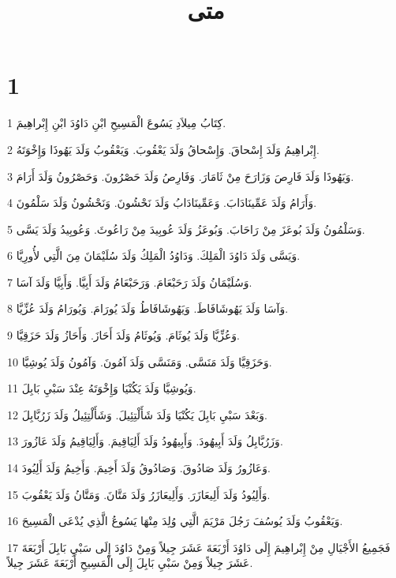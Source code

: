 

\title{متى}


\chapter{1}

\par 1 كِتَابُ مِيلاَدِ يَسُوعَ الْمَسِيحِ ابْنِ دَاوُدَ ابْنِ إِبْراهِيمَ.
\par 2 إِبْراهِيمُ وَلَدَ إِسْحاقَ. وَإِسْحاقُ وَلَدَ يَعْقُوبَ. وَيَعْقُوبُ وَلَدَ يَهُوذَا وَإِخْوَتَهُ.
\par 3 وَيَهُوذَا وَلَدَ فَارِصَ وَزَارَحَ مِنْ ثَامَارَ. وَفَارِصُ وَلَدَ حَصْرُونَ. وَحَصْرُونُ وَلَدَ أَرَامَ.
\par 4 وَأَرَامُ وَلَدَ عَمِّينَادَابَ. وَعَمِّينَادَابُ وَلَدَ نَحْشُونَ. وَنَحْشُونُ وَلَدَ سَلْمُونَ.
\par 5 وَسَلْمُونُ وَلَدَ بُوعَزَ مِنْ رَاحَابَ. وَبُوعَزُ وَلَدَ عُوبِيدَ مِنْ رَاعُوثَ. وَعُوبِيدُ وَلَدَ يَسَّى.
\par 6 وَيَسَّى وَلَدَ دَاوُدَ الْمَلِكَ. وَدَاوُدُ الْمَلِكُ وَلَدَ سُلَيْمَانَ مِنَ الَّتِي لأُورِيَّا.
\par 7 وَسُلَيْمَانُ وَلَدَ رَحَبْعَامَ. وَرَحَبْعَامُ وَلَدَ أَبِيَّا. وَأَبِيَّا وَلَدَ آسَا.
\par 8 وَآسَا وَلَدَ يَهُوشَافَاطَ. وَيَهُوشَافَاطُ وَلَدَ يُورَامَ. وَيُورَامُ وَلَدَ عُزِّيَّا.
\par 9 وَعُزِّيَّا وَلَدَ يُوثَامَ. وَيُوثَامُ وَلَدَ أَحَازَ. وَأَحَازُ وَلَدَ حَزَقِيَّا.
\par 10 وَحَزَقِيَّا وَلَدَ مَنَسَّى. وَمَنَسَّى وَلَدَ آمُونَ. وَآمُونُ وَلَدَ يُوشِيَّا.
\par 11 وَيُوشِيَّا وَلَدَ يَكُنْيَا وَإِخْوَتَهُ عِنْدَ سَبْيِ بَابِلَ.
\par 12 وَبَعْدَ سَبْيِ بَابِلَ يَكُنْيَا وَلَدَ شَأَلْتِئِيلَ. وَشَأَلْتِئِيلُ وَلَدَ زَرُبَّابِلَ.
\par 13 وَزَرُبَّابِلُ وَلَدَ أَبِيهُودَ. وَأَبِيهُودُ وَلَدَ أَلِيَاقِيمَ. وَأَلِيَاقِيمُ وَلَدَ عَازُورَ.
\par 14 وَعَازُورُ وَلَدَ صَادُوقَ. وَصَادُوقُ وَلَدَ أَخِيمَ. وَأَخِيمُ وَلَدَ أَلِيُودَ.
\par 15 وَأَلِيُودُ وَلَدَ أَلِيعَازَرَ. وَأَلِيعَازَرُ وَلَدَ مَتَّانَ. وَمَتَّانُ وَلَدَ يَعْقُوبَ.
\par 16 وَيَعْقُوبُ وَلَدَ يُوسُفَ رَجُلَ مَرْيَمَ الَّتِي وُلِدَ مِنْهَا يَسُوعُ الَّذِي يُدْعَى الْمَسِيحَ.
\par 17 فَجَمِيعُ الأَجْيَالِ مِنْ إِبْراهِيمَ إِلَى دَاوُدَ أَرْبَعَةَ عَشَرَ جِيلاً وَمِنْ دَاوُدَ إِلَى سَبْيِ بَابِلَ أَرْبَعَةَ عَشَرَ جِيلاً وَمِنْ سَبْيِ بَابِلَ إِلَى الْمَسِيحِ أَرْبَعَةَ عَشَرَ جِيلاً.
